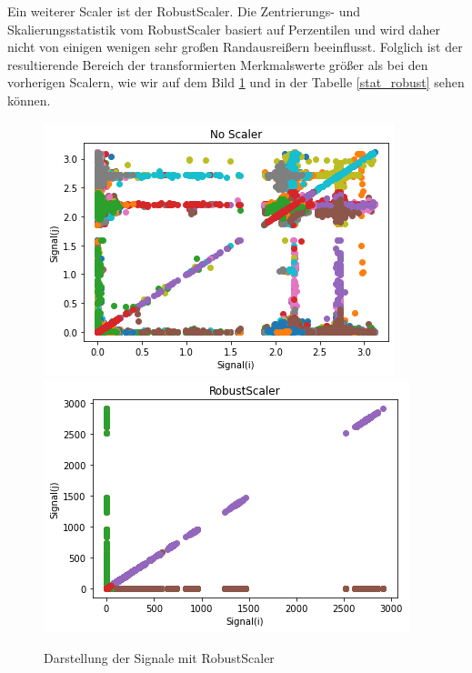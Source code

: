 \documentclass[12pt,a4paper]{scrartcl}
\numberwithin{equation}{section}
\begin{document}
Ein weiterer Scaler ist der RobustScaler. Die Zentrierungs- und Skalierungsstatistik vom RobustScaler basiert auf Perzentilen und wird daher nicht von einigen wenigen sehr großen Randausreißern beeinflusst. Folglich ist der resultierende Bereich der transformierten Merkmalswerte größer als bei den vorherigen Scalern, wie wir auf dem Bild \ref{RobustScaler} und in der Tabelle \ref{stat_robust} sehen können. 

\begin{figure}[ht!]
	\centering
	  \includegraphics[scale=0.5]{noScaler.png}
	  \includegraphics[scale=0.5]{RobustScaler.png}
	  \caption{Darstellung der Signale mit RobustScaler}
	\label{RobustScaler}
\end{figure}
\end{document}
